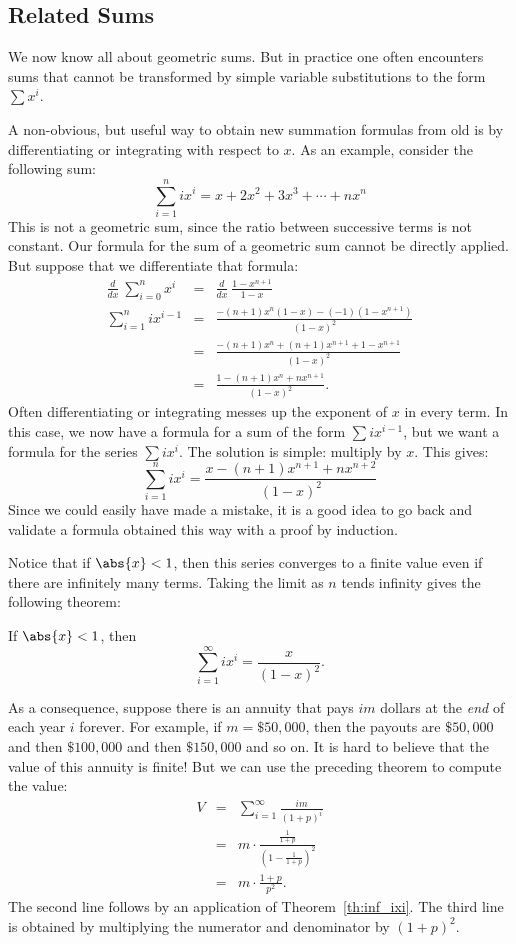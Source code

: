 \begin{staffnotes}
\subsection{Related Sums}

We now know all about geometric sums.  But in practice one often
encounters sums that cannot be transformed by simple variable
substitutions to the form $\sum x^i$.

A non-obvious, but useful way to obtain new summation formulas from
old is by differentiating or integrating with respect to $x$.  As an
example, consider the following sum:
\[
\sum_{i=1}^n i x^i = x + 2 x^2 + 3 x^3 + \cdots + n x^n
\]
This is not a geometric sum, since the ratio between successive
terms is not constant.  Our formula for the sum of a geometric sum
cannot be directly applied.  But suppose that we differentiate that
formula:
\begin{eqnarray*}
\frac{d}{dx} \ \sum_{i=0}^{n} x^i
  & = & \frac{d}{dx} \ \frac{1 - x^{n+1}}{1 - x} \\
\sum_{i=1}^{n} i x^{i-1}
 & = & \frac{-(n+1)x^n (1-x) - (-1)(1-x^{n+1})}{(1 - x)^2} \\
 & = & \frac{-(n+1)x^n + (n+1)x^{n+1} + 1 - x^{n+1}}{(1 - x)^2} \\
 & = & \frac{1 - (n+1)x^n + n x^{n+1}}{(1 - x)^2}.
\end{eqnarray*}
Often differentiating or integrating messes up the exponent of $x$ in
every term.  In this case, we now have a formula for a sum of the
form $\sum i x^{i-1}$, but we want a formula for the series $\sum i
x^i$.  The solution is simple: multiply by $x$.  This gives:
\[
\sum_{i=1}^{n} i x^i = \frac{x - (n+1)x^{n+1} + n x^{n+2}}{(1 - x)^2}
\]
Since we could easily have made a mistake, it is a good idea to go
back and validate a formula obtained this way with a proof by
induction.

Notice that if $\abs{x} < 1$, then this series converges to a finite value
even if there are infinitely many terms.  Taking the limit as $n$ tends
infinity gives the following theorem:
\begin{theorem}\label{th:inf_ixi}
If $\abs{x} < 1$, then
\[
\sum_{i=1}^\infty i x^i = \frac{x}{(1-x)^2}.
\]
\end{theorem}

As a consequence, suppose there is an annuity that pays $im$ dollars
at the {\em end} of each year $i$ forever.  For example, if $m =
\$50,000$, then the payouts are $\$50,000$ and then $\$100,000$ and
then $\$150,000$ and so on.  It is hard to believe that the value of
this annuity is finite!  But we can use the preceding theorem to
compute the value:
\begin{eqnarray*}
V & = & \sum_{i=1}^\infty \frac{im}{(1+p)^i} \\
  & = & m \cdot \frac{\frac{1}{1+p}}{(1 - \frac{1}{1+p})^2} \\
  & = & m \cdot \frac{1+p}{p^2}.
\end{eqnarray*}
The second line follows by an application of Theorem~\ref{th:inf_ixi}.
The third line is obtained by multiplying the numerator and
denominator by $(1+p)^2$.


\end{staffnotes}
